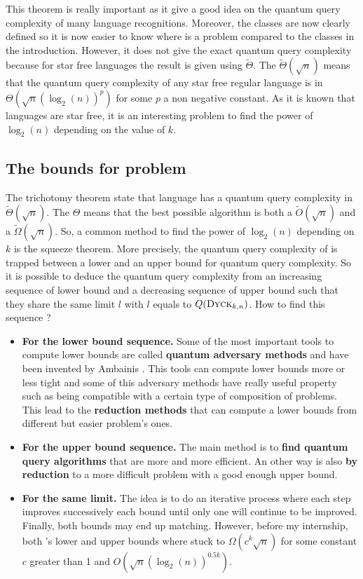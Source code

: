 This theorem is really important as it give a good idea on the quantum query complexity
of many language recognitions. Moreover, the classes are now clearly defined so it is now
easier to know where is a problem compared to the classes in the introduction. However,
it does not give the exact quantum query complexity because for star free languages
the result is given using \(\tilde{\Theta}\). The $\tilde{\Theta}(\sqrt{n})$ means that
the quantum query complexity of any star free regular language is in
$\Theta(\sqrt{n}(\log_2(n))^p)$ for some $p$ a non negative constant.
As it is known that  languages are star free, it is an interesting problem
to find the power of $\log_2(n)$ depending on the value of $k$.

\subsection{The bounds for  problem}

The trichotomy theorem state that  language has a quantum query complexity
in $\tilde{\Theta}(\sqrt{n})$. The $\Theta$ means that the best possible algorithm
is both a $\tilde{O}(\sqrt{n})$ and a $\tilde{\Omega}(\sqrt{n})$. So, a common method
to find the power of $\log_2(n)$ depending on $k$ is the squeeze theorem. More
precisely, the quantum query complexity of  is trapped between a lower
and an upper bound for quantum query complexity. So it is possible to deduce
the quantum query complexity from an increasing sequence of lower bound and
a decreasing sequence of upper bound such that they share the same limit $l$ with $l$
equals to $Q(\textsc{Dyck$_{k,n}$})$. How to find this sequence ?
\begin{itemize}
    \item \textbf{For the lower bound sequence.} Some of the most important tools to compute
          lower bounds are called \textbf{quantum adversary methods} and have been invented by Ambainis
          \cite{andris_adversary_methode}. This tools can compute
          lower bounds more or less tight and some of this adversary methods have really
          useful property such as being compatible with a certain type of composition
          of problems. This lead to the \textbf{reduction methods} that can compute
          a lower bounds from different but easier problem's ones.
    \item \textbf{For the upper bound sequence.} The main method is to \textbf{find quantum
              query algorithms} that are more and more efficient. An other way is also
          \textbf{by reduction} to a more difficult problem with a
          good enough upper bound.
    \item \textbf{For the same limit.}
          The idea is to do an iterative process where each step improves successively
          each bound until only one will continue to be improved. Finally, both
          bounds may end up matching. However, before my internship, both 's
          lower and upper bounds where stuck to $\Omega\left(c^k\sqrt{n}\right)$ for some
          constant $c$ greater than 1 and $O\left(\sqrt{n}\left(\log_2(n)\right)^{0.5k}\right)$.
\end{itemize}



